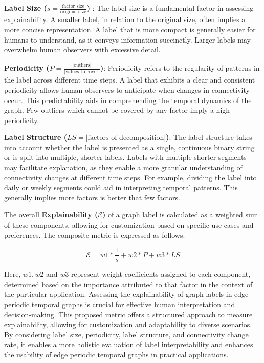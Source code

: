 \textbf{Label Size ($s = \frac{\text{factor size}}{\text{original size}}$) }: The label size is a fundamental factor in assessing explainability. A smaller label, in relation to the original size, often implies a more concise representation. A label that is more compact is generally easier for humans to understand, as it conveys information succinctly. Larger labels may overwhelm human observers with excessive detail.

\textbf{Periodicity ($P = \frac{|\text{outliers}|}{|\text{values to cover}|}$)}: Periodicity refers to the regularity of patterns in the label across different time steps. A label that exhibits a clear and consistent periodicity allows human observers to anticipate when changes in connectivity occur. This predictability aids in comprehending the temporal dynamics of the graph. Few outliers which cannot be covered by any factor imply a high periodicity.

\textbf{Label Structure ($LS = |\text{factors of decomposition}|$)}: The label structure takes into account whether the label is presented as a single, continuous binary string or is split into multiple, shorter labels. Labels with multiple shorter segments may facilitate explanation, as they enable a more granular understanding of connectivity changes at different time steps. For example, dividing the label into daily or weekly segments could aid in interpreting temporal patterns. This generally implies more factors is better that few factors.

The overall \textbf{Explainability ($\mathcal{E}$)} of a graph label is calculated as a weighted sum of these components, allowing for customization based on specific use cases and preferences. The composite metric is expressed as follows:

\[
\mathcal{E} = w1 * \frac{1}{s} + w2 * P + w3 * LS
\]

Here, $w1, w2$ and $w3$ represent weight coefficients assigned to each component, determined based on the importance attributed to that factor in the context of the particular application. Assessing the explainability of graph labels in edge periodic temporal graphs is crucial for effective human interpretation and decision-making. This proposed metric offers a structured approach to measure explainability, allowing for customization and adaptability to diverse scenarios. By considering label size, periodicity, label structure, and connectivity change rate, it enables a more holistic evaluation of label interpretability and enhances the usability of edge periodic temporal graphs in practical applications.

